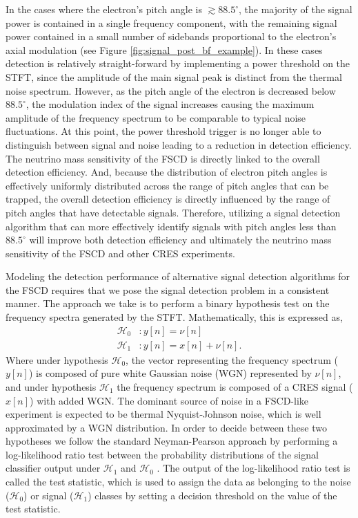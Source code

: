 In the cases where the electron's pitch angle is $\gtrsim 88.5^\circ$, the majority of the signal power is contained in a single frequency component, with the remaining signal power contained in a small number of sidebands proportional to the electron's axial modulation (see Figure \ref{fig:signal_post_bf_example}). In these cases detection is relatively straight-forward by implementing a power threshold on the STFT, since the amplitude of the main signal peak is distinct from the thermal noise spectrum. However, as the pitch angle of the electron is decreased below $88.5^\circ$, the modulation index of the signal increases causing the maximum amplitude of the frequency spectrum to be comparable to typical noise fluctuations. At this point, the power threshold trigger is no longer able to distinguish between signal and noise leading to a reduction in detection efficiency. The neutrino mass sensitivity of the FSCD is directly linked to the overall detection efficiency. And, because the distribution of electron pitch angles is effectively uniformly distributed across the range of pitch angles that can be trapped, the overall detection efficiency is directly influenced by the range of pitch angles that have detectable signals. Therefore, utilizing a signal detection algorithm that can more effectively identify signals with pitch angles less than $88.5^\circ$ will improve both detection efficiency and ultimately the neutrino mass sensitivity of the FSCD and other CRES experiments. 

Modeling the detection performance of alternative signal detection algorithms for the FSCD requires that we pose the signal detection problem in a consistent manner. The approach we take is to perform a binary hypothesis test on the frequency spectra generated by the STFT. Mathematically, this is expressed as,
\begin{align}
    \mathcal{H}_0 & : y[n]=\nu[n]\\
    \mathcal{H}_1 & : y[n]=x[n]+\nu[n].
\end{align}
Where under hypothesis $\mathcal{H}_0$, the vector representing the frequency spectrum ($y[n]$) is composed of pure white Gaussian noise (WGN) represented by $\nu[n]$, and under hypothesis $\mathcal{H}_1$ the frequency spectrum is composed of a CRES signal ($x[n]$) with added WGN. The dominant source of noise in a FSCD-like experiment is expected to be thermal Nyquist-Johnson noise, which is well approximated by a WGN distribution. In order to decide between these two hypotheses we follow the standard Neyman-Pearson approach by performing a log-likelihood ratio test between the probability distributions of the signal classifier output under $\mathcal{H}_1$ and $\mathcal{H}_0$ \cite{detection_theory}. The output of the log-likelihood ratio test is called the test statistic, which is used to assign the data as belonging to the noise ($\mathcal{H}_0$) or signal ($\mathcal{H}_1$) classes by setting a decision threshold on the value of the test statistic. 


